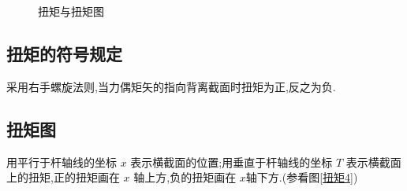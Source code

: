 \begin{figure}[!htbp]
	
	\centering
	\caption{扭矩与扭矩图}
\end{figure}

\subsection{扭矩的符号规定}
采用右手螺旋法则,当力偶矩矢的指向背离截面时扭矩为正,反之为负.

\subsection{扭矩图}
用平行于杆轴线的坐标 $x$ 表示横截面的位置;用垂直于杆轴线的坐标 $T$ 表示横截面上的扭矩,正的扭矩画在 $x$ 轴上方,负的扭矩画在 $x$轴下方.(参看图\ref{扭矩4})

